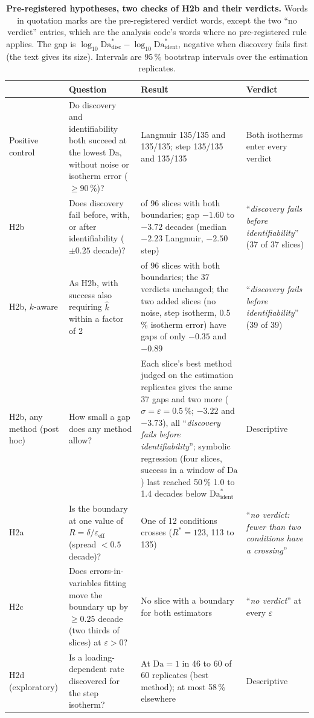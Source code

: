 \documentclass[11pt]{article}
\newcommand{\Da}{\mathrm{Da}}
\newcommand{\verdict}[1]{``\textit{#1}''}
\begin{document}
\begin{table}[p]
\centering
\small
\caption{\textbf{Pre-registered hypotheses, two checks of H2b and their verdicts.} Words in quotation marks are
the pre-registered verdict words, except the two ``no verdict'' entries, which are the analysis
code's words where no pre-registered rule applies. The gap is
$\log_{10}\Da^{*}_{\mathrm{disc}} - \log_{10}\Da^{*}_{\mathrm{ident}}$, negative when discovery
fails first (the text gives its size). Intervals are 95\,\% bootstrap intervals over the estimation replicates.}
\label{tab:verdicts}
\begin{tabularx}{\textwidth}{@{}l>{\raggedright\arraybackslash}X>{\raggedright\arraybackslash}X>{\raggedright\arraybackslash}X@{}}
\toprule
& Question & Result & Verdict \\
\midrule
Positive control & Do discovery and identifiability both succeed at the lowest $\Da$, without
noise or isotherm error ($\ge 90\,\%$)? & Langmuir 135/135 and 135/135; step 135/135 and
135/135 & Both isotherms enter every verdict \\
H2b & Does discovery fail before, with, or after identifiability ($\pm 0.25$ decade)? & 37 of 96
slices with both boundaries; gap $-1.60$ to $-3.72$ decades (median $-2.23$ Langmuir, $-2.50$
step) & \verdict{discovery fails before identifiability} (37 of 37 slices) \\
H2b, $k$-aware & As H2b, with success also requiring $\hat{k}$ within a factor of 2 &
39 of 96 slices with both boundaries; the 37 verdicts unchanged; the two added slices (no noise, step
isotherm, 0.5\,\% isotherm error) have gaps of only $-0.35$ and $-0.89$ & \verdict{discovery fails before identifiability} (39 of 39) \\
H2b, any method (post hoc) & How small a gap does any method allow? & Each slice's best
method judged on the estimation replicates gives the same 37 gaps and two more ($\sigma =
\varepsilon = 0.5\,\%$; $-3.22$ and $-3.73$), all \verdict{discovery fails before identifiability}; symbolic regression
(four slices, success in a window of $\Da$) last reached 50\,\% 1.0 to 1.4 decades below
$\Da^{*}_{\mathrm{ident}}$ & Descriptive \\
H2a & Is the boundary at one value of $R = \delta/\varepsilon_{\mathrm{eff}}$ (spread
$< 0.5$ decade)? & One of 12 conditions crosses ($R^{*} = 123$, 113 to 135) &
\verdict{no verdict: fewer than two conditions have a crossing} \\
H2c & Does errors-in-variables fitting move the boundary up by $\ge 0.25$ decade (two thirds of slices) at $\varepsilon > 0$? &
No slice with a boundary for both estimators & \verdict{no verdict} at every $\varepsilon$ \\
H2d (exploratory) & Is a loading-dependent rate discovered for the step isotherm? & At
$\Da = 1$ in 46 to 60 of 60 replicates (best method); at most 58\,\% elsewhere & Descriptive \\
\bottomrule
\end{tabularx}
\end{table}
\end{document}
